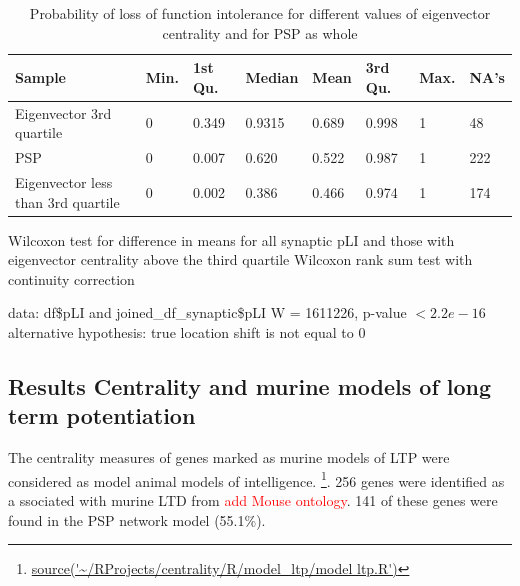 \begin{table}[]
    \centering
    \begin{tabular}{llllllll}
    \toprule
      Sample &  Min. &1st Qu.&  Median &   Mean& 3rd Qu.&    Max. &   NA's     \\
      \midrule
     Eigenvector 3rd quartile  &0& 0.349& 0.9315& 0.689& 0.998& 1&     48  \\ 
     PSP &0&0.007&0.620&0.522&0.987&  1 & 222\\
     Eigenvector less than 3rd quartile &0&0.002&0.386&0.466&0.974&1&    174\\
     \bottomrule
    \end{tabular}
    \caption{Probability of loss of function intolerance for different values of eigenvector centrality and for PSP as whole}
    \label{tab:pli and eigenvector centrality quartiles}
\end{table}




Wilcoxon test for difference in means for all synaptic pLI and those with eigenvector centrality above the third quartile
        Wilcoxon rank sum test with continuity correction

data:  df\$pLI and joined\_df\_synaptic\$pLI
W = 1611226, p-value $< 2.2e-16$
alternative hypothesis: true location shift is not equal to 0



\subsection{Results Centrality and murine models of long term potentiation}
\label{sec:results centrality and murine models of long term potentiation}
    The centrality measures of genes marked as murine models of LTP were considered as model animal models of intelligence. \footnote{\url{source('~/RProjects/centrality/R/model_ltp/model ltp.R')}}.
    256 genes were identified as a
    ssociated with murine LTD from \textcolor{red}{add Mouse ontology}. 141 of these genes were found in the PSP network model (55.1\%).
    
